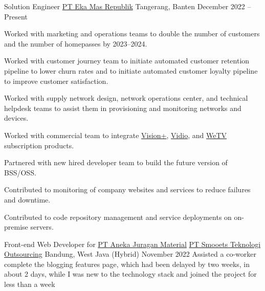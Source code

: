 


\begin{cventries}


\cventry
{Solution Engineer} %
{\href{https://myrepublic.co.id/}{PT Eka Mas Republik}} %
{Tangerang, Banten} %
{December 2022 -- Present} %
{ %
\begin{cvitems}
\item {Worked with marketing and operations teams to double the number of customers and the number of homepasses by 2023--2024.}
\item {Worked with customer journey team to initiate automated customer retention pipeline to lower churn rates and to initiate automated customer loyalty pipeline to improve customer satisfaction.}
\item {Worked with supply network design, network operations center, and technical helpdesk teams to assist them in provisioning and monitoring networks and devices.}
\item {Worked with commercial team to integrate \href{https://www.visionplus.id/}{Vision+}, \href{https://www.vidio.com/}{Vidio}, and \href{https://wetv.vip/}{WeTV} subscription products.}
\item {Partnered with new hired developer team to build the future version of BSS/OSS.}
\item {Contributed to monitoring of company websites and services to reduce failures and downtime.}
\item {Contributed to code repository management and service deployments on on-premise servers.}
\end{cvitems}
}


\cventry
{Front-end Web Developer for \href{https://juraganmaterial.id/}{PT Aneka Juragan Material}} %
{\href{https://www.smooets.com/}{PT Smooets Teknologi Outsourcing}} %
{Bandung, West Java (Hybrid)} %
{November 2022} %
{ %
Assisted a co-worker complete the blogging features page, which had been delayed by two weeks, in about 2 days, while I was new to the technology stack and joined the project for less than a week
}


\end{cventries}

